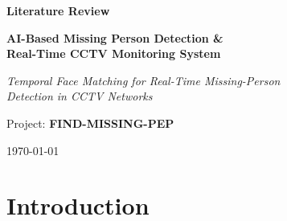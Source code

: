 \documentclass[12pt, a4paper]{article}
\begin{document}
\begin{titlepage}
    \centering
    \vspace*{2cm}
    
    {\LARGE\bfseries Literature Review\par}
    \vspace{1.5cm}
    
    {\Large\bfseries AI-Based Missing Person Detection \&\\
    Real-Time CCTV Monitoring System\par}
    \vspace{0.8cm}
    
    {\large\itshape Temporal Face Matching for Real-Time Missing-Person\\
    Detection in CCTV Networks\par}
    
    \vspace{2cm}
    
    {\large Project: \textbf{FIND-MISSING-PEP}\par}
    
    \vspace{3cm}
    
    
    \vfill
    {\large \today\par}
\end{titlepage}

\newpage
\tableofcontents
\thispagestyle{fancy}

\newpage
\section{Introduction}
\end{document}
